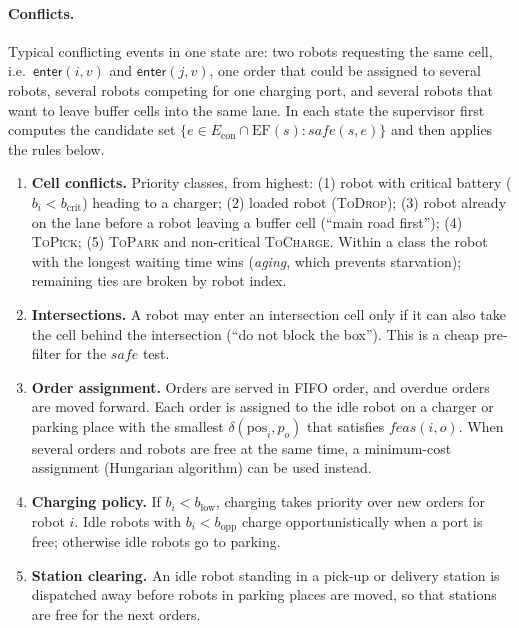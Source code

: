 \documentclass[11pt,a4paper]{article}
\newcommand{\ev}[1]{\mathsf{#1}}            %
\newcommand{\md}[1]{\textsc{#1}}            %
\newcommand{\EF}{\mathrm{EF}}
\newcommand{\Econ}{E_{\mathrm{con}}}
\newcommand{\pos}{\mathrm{pos}}
\begin{document}
\paragraph{Conflicts.} Typical conflicting events in one state are:
two robots requesting the same cell, i.e.\ $\ev{enter}(i,v)$ and $\ev{enter}(j,v)$,
one order that could be assigned to several robots, several robots competing
for one charging port, and several robots that want to leave buffer cells into
the same lane. In each state the supervisor first computes the candidate
set $\{e\in\Econ\cap\EF(s) : \mathit{safe}(s,e)\}$ and then applies
the rules below.
\begin{enumerate}[label=\textbf{R\arabic*.},leftmargin=*]
  \item \textbf{Cell conflicts.} Priority classes, from highest:
        (1) robot with critical battery ($b_i<b_{\mathrm{crit}}$) heading to a
        charger; (2) loaded robot (\md{ToDrop}); (3) robot already on the lane
        before a robot leaving a buffer cell (``main road first''); (4)
        \md{ToPick}; (5) \md{ToPark} and non-critical \md{ToCharge}.
        Within a class the robot with the longest waiting time wins
        (\emph{aging}, which prevents starvation); remaining ties are broken by
        robot index.
  \item \textbf{Intersections.} A robot may enter an intersection cell only if
        it can also take the cell behind the intersection (``do not block the
        box''). This is a cheap pre-filter for the $\mathit{safe}$ test.
  \item \textbf{Order assignment.} Orders are served in FIFO order, and
        overdue orders are moved forward. Each order is assigned to the idle
        robot on a charger or parking place with the smallest
        $\delta(\pos_i,p_o)$ that satisfies $\mathit{feas}(i,o)$. When several orders and robots are free at the
        same time, a minimum-cost assignment (Hungarian algorithm) can be
        used instead.
  \item \textbf{Charging policy.} If $b_i<b_{\mathrm{low}}$, charging takes
        priority over new orders for robot $i$. Idle robots with
        $b_i<b_{\mathrm{opp}}$ charge opportunistically when a port is free;
        otherwise idle robots go to parking.
  \item \textbf{Station clearing.} An idle robot standing in a pick-up or
        delivery station is dispatched away before robots in parking places
        are moved, so that stations are free for the next orders.
\end{enumerate}
\end{document}
